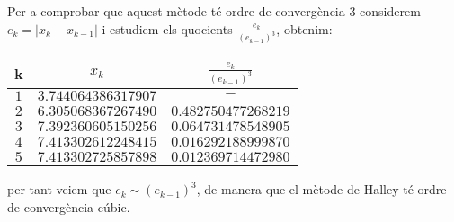 \documentclass[12pt]{article}
\begin{document}
	Per a comprobar que aquest mètode té ordre de convergència $3$ considerem $e_k=|x_k-x_{k-1}|$ i estudiem els quocients $\frac{e_k}{(e_{k-1})^3}$, obtenim:
	\begin{center}
		\begin{tabular}{c|c|c}
			k&$x_k$&$\frac{e_k}{(e_{k-1})^3}$\\
			\hline
			\hline
			$1$&$3.744064386317907$&$-$\\
			\hline
			$2$&$6.305068367267490$&$0.482750477268219$\\
			\hline
			$3$&$7.392360605150256$&$0.064731478548905$\\
			\hline
			$4$&$7.413302612248415$&$0.016292188999870$\\
			\hline
			$5$&$7.413302725857898$&$0.012369714472980$\\
			\hline
		\end{tabular}
	\end{center}
	per tant veiem que $e_k\sim (e_{k-1})^3$, de manera que el mètode de Halley té ordre de convergència cúbic.
	
\end{document}
